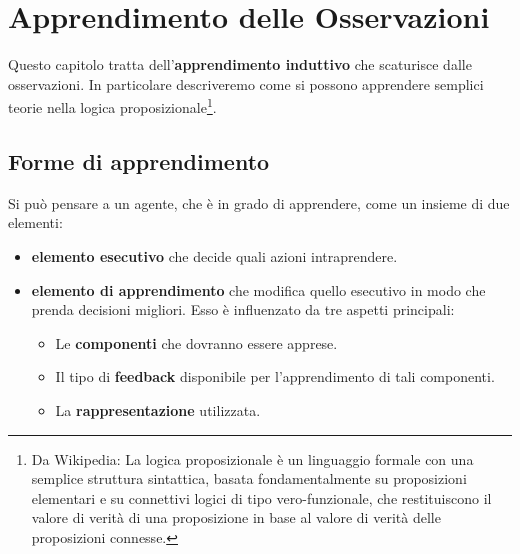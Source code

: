 \chapter{Apprendimento delle Osservazioni}
\label{Capitolo 1}
Questo capitolo tratta dell'\textbf{apprendimento induttivo} che scaturisce dalle osservazioni. In particolare descriveremo come si possono apprendere semplici teorie nella logica proposizionale\footnote{Da Wikipedia: La logica proposizionale è un linguaggio formale con una semplice struttura sintattica, basata fondamentalmente su proposizioni elementari e su connettivi logici di tipo vero-funzionale, che restituiscono il valore di verità di una proposizione in base al valore di verità delle proposizioni connesse.}.
\section{Forme di apprendimento}
Si può pensare a un agente, che è in grado di apprendere, come un insieme di due elementi:
\begin{itemize}
    \item \textbf{elemento esecutivo} che decide quali azioni intraprendere.
    \item \textbf{elemento di apprendimento} che modifica quello esecutivo in modo che prenda decisioni migliori. Esso è influenzato da tre aspetti principali:
    \begin{itemize}
        \item Le \textbf{componenti} che dovranno essere apprese.
        \item Il tipo di \textbf{feedback} disponibile per l'apprendimento di tali componenti.
        \item La \textbf{rappresentazione} utilizzata.
    \end{itemize}
\end{itemize}

